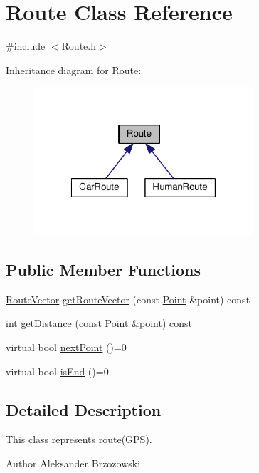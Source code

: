 \hypertarget{classRoute}{\section{Route Class Reference}
\label{classRoute}
}


{\ttfamily \#include $<$Route.\-h$>$}



Inheritance diagram for Route\-:
\nopagebreak
\begin{figure}[H]
\begin{center}
\leavevmode
\includegraphics[width=231pt]{classRoute__inherit__graph}
\end{center}
\end{figure}
\subsection*{Public Member Functions}
\begin{DoxyCompactItemize}
\item 
\hyperlink{classRouteVector}{Route\-Vector} \hyperlink{classRoute_aade7196ddcba6bc6191495992a3abbbe}{get\-Route\-Vector} (const \hyperlink{classPoint}{Point} \&point) const 
\item 
int \hyperlink{classRoute_a637b4390cd5b98be93d7481232bf173d}{get\-Distance} (const \hyperlink{classPoint}{Point} \&point) const 
\item 
virtual bool \hyperlink{classRoute_a27bb16170420801b5c191e9aea0134f1}{next\-Point} ()=0
\item 
virtual bool \hyperlink{classRoute_a0e1d104b56c768549f1b4fe4b575a6f5}{is\-End} ()=0
\end{DoxyCompactItemize}


\subsection{Detailed Description}
This class represents route(\-G\-P\-S). \begin{DoxyAuthor}{Author}
Aleksander Brzozowski 
\end{DoxyAuthor}


